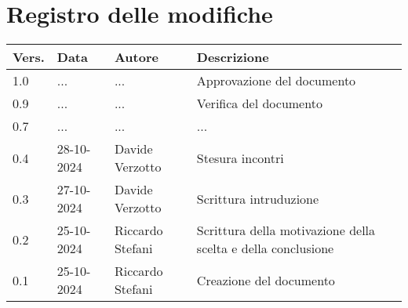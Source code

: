 \section*{Registro delle modifiche}

\begin{table}[h]
    \centering
    \begin{tabular}{|l|l|l|p{5cm}|}
        \hline
        \rowcolor[gray]{0.9}
        \textbf{Vers.} & \textbf{Data} & \textbf{Autore} & \textbf{Descrizione}\\
        \hline
        1.0 & ... & ... & Approvazione del documento\\
        \hline
        0.9 & ... & ... & Verifica del documento\\
        \hline
        0.7 & ... & ... & ...\\
        \hline
        0.4 & 28-10-2024 & Davide Verzotto & Stesura incontri\\
        \hline
        0.3 & 27-10-2024 & Davide Verzotto & Scrittura intruduzione\\
        \hline
        0.2 & 25-10-2024 & Riccardo Stefani & Scrittura della motivazione della scelta e della conclusione\\
        \hline
        0.1 & 25-10-2024 & Riccardo Stefani & Creazione del documento\\
        \hline
    \end{tabular}
\end{table}
